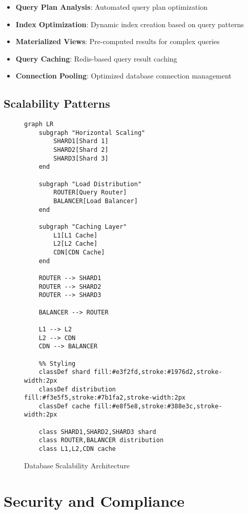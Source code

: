 \documentclass[12pt,a4paper]{article}
\begin{document}
\begin{itemize}
    \item \textbf{Query Plan Analysis}: Automated query plan optimization
    \item \textbf{Index Optimization}: Dynamic index creation based on query patterns
    \item \textbf{Materialized Views}: Pre-computed results for complex queries
    \item \textbf{Query Caching}: Redis-based query result caching
    \item \textbf{Connection Pooling}: Optimized database connection management
\end{itemize}

\subsection{Scalability Patterns}

\begin{figure}[H]
\centering
\begin{verbatim}
graph LR
    subgraph "Horizontal Scaling"
        SHARD1[Shard 1]
        SHARD2[Shard 2]
        SHARD3[Shard 3]
    end
    
    subgraph "Load Distribution"
        ROUTER[Query Router]
        BALANCER[Load Balancer]
    end
    
    subgraph "Caching Layer"
        L1[L1 Cache]
        L2[L2 Cache]
        CDN[CDN Cache]
    end
    
    ROUTER --> SHARD1
    ROUTER --> SHARD2
    ROUTER --> SHARD3
    
    BALANCER --> ROUTER
    
    L1 --> L2
    L2 --> CDN
    CDN --> BALANCER
    
    %% Styling
    classDef shard fill:#e3f2fd,stroke:#1976d2,stroke-width:2px
    classDef distribution fill:#f3e5f5,stroke:#7b1fa2,stroke-width:2px
    classDef cache fill:#e8f5e8,stroke:#388e3c,stroke-width:2px
    
    class SHARD1,SHARD2,SHARD3 shard
    class ROUTER,BALANCER distribution
    class L1,L2,CDN cache
\end{verbatim}
\caption{Database Scalability Architecture}
\end{figure}

\section{Security and Compliance}
\end{document}
